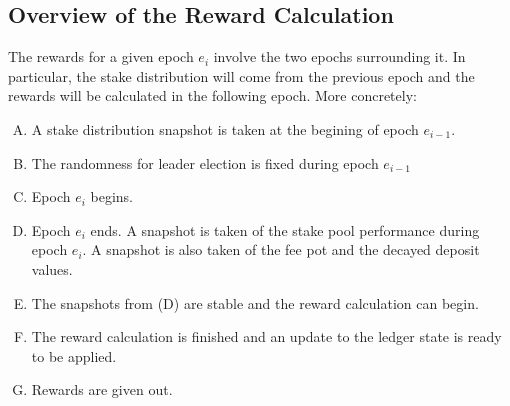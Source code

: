 \subsection{Overview of the Reward Calculation}
\label{sec:reward-overview}

The rewards for a given epoch $e_i$ involve the two epochs surrounding it.
In particular, the stake distribution will come from the previous epoch
and the rewards will be calculated in the following epoch.
More concretely:
\begin{enumerate}[(A)]%
  \item A stake distribution snapshot is taken at the begining of epoch $e_{i-1}$.
  \item The randomness for leader election is fixed during epoch $e_{i-1}$
  \item Epoch $e_{i}$ begins.
  \item Epoch $e_{i}$ ends.
    A snapshot is taken of the stake pool performance during epoch $e_{i}$.
    A snapshot is also taken of the fee pot and the decayed deposit values.
  \item The snapshots from (D) are stable and the reward calculation can begin.
  \item The reward calculation is finished and an update to the ledger state
    is ready to be applied.
  \item Rewards are given out.
\end{enumerate}

\usetikzlibrary{decorations.pathreplacing}


